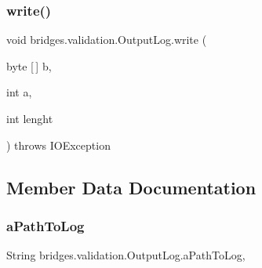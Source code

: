 \hypertarget{classbridges_1_1validation_1_1_output_log_ad0ada8f6ff72218f18b64672690fc94f}{}\label{classbridges_1_1validation_1_1_output_log_ad0ada8f6ff72218f18b64672690fc94f} 
\subsubsection{\texorpdfstring{write()}{write()}\hspace{0.1cm}{\footnotesize\ttfamily [3/3]}}
{\footnotesize\ttfamily void bridges.\+validation.\+Output\+Log.\+write (\begin{DoxyParamCaption}\item[{byte \mbox{[}$\,$\mbox{]}}]{b,  }\item[{int}]{a,  }\item[{int}]{lenght }\end{DoxyParamCaption}) throws I\+O\+Exception}



\subsection{Member Data Documentation}
\hypertarget{classbridges_1_1validation_1_1_output_log_a74d7353fe97c80b3880825d18d7ccaa5}{}\label{classbridges_1_1validation_1_1_output_log_a74d7353fe97c80b3880825d18d7ccaa5} 
\subsubsection{\texorpdfstring{a\+Path\+To\+Log}{aPathToLog}}
{\footnotesize\ttfamily String bridges.\+validation.\+Output\+Log.\+a\+Path\+To\+Log\hspace{0.3cm}{\ttfamily [static]}, {\ttfamily [protected]}}

\hypertarget{classbridges_1_1validation_1_1_output_log_a0f6ae61da2727193baf2d79a78f68614}{}\label{classbridges_1_1validation_1_1_output_log_a0f6ae61da2727193baf2d79a78f68614} 
